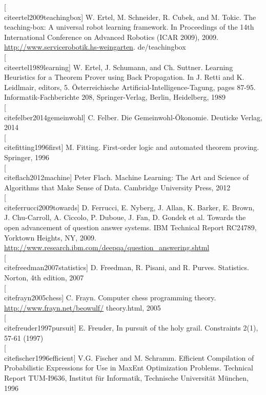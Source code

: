 \documentclass[10pt]{book}
\begin{document}
[\\cite{ertel2009teachingbox}] W. Ertel, M. Schneider, R. Cubek, and M. Tokic. The teaching-box: A universal robot learning framework. In Proceedings of the 14th International Conference on Advanced Robotics (ICAR 2009), 2009. \href{http://www.servicerobotik.hs-weingarten}{http://www.servicerobotik.hs-weingarten}. de/teachingbox\\[0pt]
[\\cite{ertel1989learning}] W. Ertel, J. Schumann, and Ch. Suttner. Learning Heuristics for a Theorem Prover using Back Propagation. In J. Retti and K. Leidlmair, editors, 5. Österreichische Artificial-Intelligence-Tagung, pages 87-95. Informatik-Fachberichte 208, Springer-Verlag, Berlin, Heidelberg, 1989\\[0pt]
[\\cite{felber2014gemeinwohl}] C. Felber. Die Gemeinwohl-Ökonomie. Deuticke Verlag, 2014\\[0pt]
[\\cite{fitting1996first}] M. Fitting. First-order logic and automated theorem proving. Springer, 1996\\[0pt]
[\\cite{flach2012machine}] Peter Flach. Machine Learning: The Art and Science of Algorithms that Make Sense of Data. Cambridge University Press, 2012\\[0pt]
[\\cite{ferrucci2009towards}] D. Ferrucci, E. Nyberg, J. Allan, K. Barker, E. Brown, J. Chu-Carroll, A. Ciccolo, P. Duboue, J. Fan, D. Gondek et al. Towards the open advancement of question answer systems. IBM Technical Report RC24789, Yorktown Heights, NY, 2009. \href{http://www.research.ibm.com/deepqa/question_answering.shtml}{http://www.research.ibm.com/deepqa/question\_answering.shtml}\\[0pt]
[\\cite{freedman2007statistics}] D. Freedman, R. Pisani, and R. Purves. Statistics. Norton, 4th edition, 2007\\[0pt]
[\\cite{frayn2005chess}] C. Frayn. Computer chess programming theory. \href{http://www.frayn.net/beowulf/}{http://www.frayn.net/beowulf/} theory.html, 2005\\[0pt]
[\\cite{freuder1997pursuit}] E. Freuder, In pursuit of the holy grail. Constraints 2(1), 57-61 (1997)\\[0pt]
[\\cite{fischer1996efficient}] V.G. Fischer and M. Schramm. Efficient Compilation of Probabilistic Expressions for Use in MaxEnt Optimization Problems. Technical Report TUM-I9636, Institut für Informatik, Technische Universität München, 1996\\[0pt]
\end{document}
